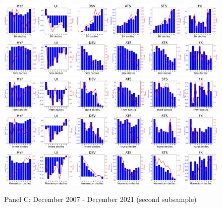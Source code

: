 \documentclass[11pt,halfline,a4paper]{ouparticle}
\begin{document}
\begin{figure}\ContinuedFloat
      \centering
    \captionsetup{justification=raggedright,singlelinecheck=false}
      \caption{Panel C: December 2007 - December 2021 (second subsample)}
    \includegraphics[width=16cm]{plots/betahist1_sample2.png}\\
    \includegraphics[width=16cm]{plots/betahist2_sample2.png}\\
    \includegraphics[width=16cm]{plots/betahist3_sample2.png}\\
    \includegraphics[width=16cm]{plots/betahist4_sample2.png}\\
    \includegraphics[width=16cm]{plots/betahist5_sample2.png}\\
\captionsetup{labelformat=empty}

\end{figure}
\end{document}
